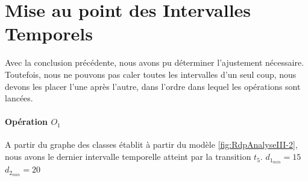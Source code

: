 
\section{Mise au point des Intervalles Temporels}
Avec la conclusion précédente, nous avons pu déterminer l'ajustement nécessaire. Toutefois, nous ne pouvons pas caler toutes les intervalles d'un seul coup, nous devons les placer l'une après l'autre, dans l'ordre dans lequel les opérations sont lancées.

\paragraph*{Opération $O_1$}
A partir du graphe des classes établit à partir du modèle \ref{fig:RdpAnalyseIII-2}, nous avons le dernier intervalle temporelle atteint par la transition $t_5$. 
$d_{1_{min}} = 15$
$d_{2_{min}} = 20$